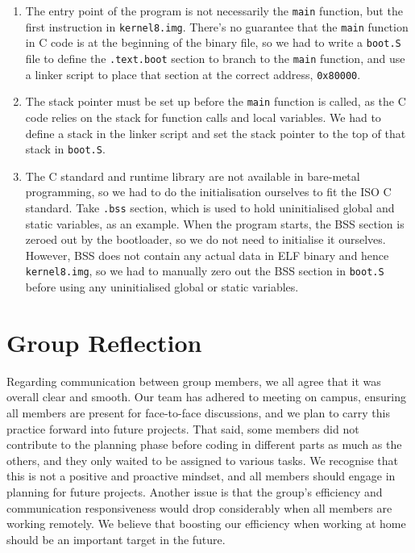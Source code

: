 \documentclass[9pt,a4paper]{article}
\begin{document}
\begin{enumerate}

  \item The entry point of the program is not necessarily the \verb|main| function, but the first instruction in \verb|kernel8.img|. There's no guarantee that the \verb|main| function in C code is at the beginning of the binary file, so we had to write a \verb|boot.S| file to define the \verb|.text.boot| section to branch to the \verb|main| function, and use a linker script to place that section at the correct address, \verb|0x80000|.

  \item The stack pointer must be set up before the \verb|main| function is called, as the C code relies on the stack for function calls and local variables. We had to define a stack in the linker script and set the stack pointer to the top of that stack in \verb|boot.S|.

  \item The C standard and runtime library are not available in bare-metal programming, so we had to do the initialisation ourselves to fit the ISO C standard. Take \verb|.bss| section, which is used to hold uninitialised global and static variables, as an example. When the program starts, the BSS section is zeroed out by the bootloader, so we do not need to initialise it ourselves. However, BSS does not contain any actual data in ELF binary and hence \verb|kernel8.img|, so we had to manually zero out the BSS section in \verb|boot.S| before using any uninitialised global or static variables.

\end{enumerate}

\section{Group Reflection}

Regarding communication between group members, we all agree that it was overall clear and smooth.
Our team has adhered to meeting on campus, ensuring all members are present for face-to-face discussions, and we plan to carry this practice forward into future projects.
That said, some members did not contribute to the planning phase before coding in different parts as much as the others, and they only waited to be assigned to various tasks.
We recognise that this is not a positive and proactive mindset, and all members should engage in planning for future projects.
Another issue is that the group's efficiency and communication responsiveness would drop considerably when all members are working remotely.
We believe that boosting our efficiency when working at home should be an important target in the future.
\end{document}
